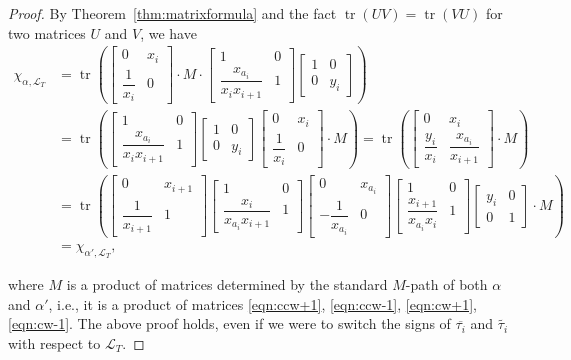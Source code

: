 \documentclass[10pt,a4paper]{amsart}
\numberwithin{equation}{section}
\theoremstyle{definition}
\begin{document}
\begin{proof}
 By Theorem~\ref{thm:matrixformula} and the fact $\operatorname{tr}(UV)=\operatorname{tr}(VU)$ for two matrices $U$ and $V$, we have
 \begin{align*}
 \chi_{\alpha, \mathcal{L}_T}&=\operatorname{tr}\left(
 \begin{bmatrix}
 0 & x_i\\
 \dfrac{1}{x_i} & 0
 \end{bmatrix}\cdot M\cdot
 \begin{bmatrix}
 1 & 0\\
 \dfrac{x_{a_i}}{x_i x_{i+1}} & 1
 \end{bmatrix}
 \begin{bmatrix}
 1 & 0\\
 0 & y_i
 \end{bmatrix}\right)\\
 &=\operatorname{tr}\left(
 \begin{bmatrix}
 1 & 0\\
 \dfrac{x_{a_i}}{x_i x_{i+1}} & 1
 \end{bmatrix}
 \begin{bmatrix}
 1 & 0\\
 0 & y_i
 \end{bmatrix}
 \begin{bmatrix}
 0 & x_i\\
 \dfrac{1}{x_i} & 0
 \end{bmatrix}\cdot M
 \right)
 = \operatorname{tr}\left(
 \begin{bmatrix}
 0 & x_i\\
 \dfrac{y_i}{x_i} & \dfrac{x_{a_i}}{x_{i+1}}
 \end{bmatrix}\cdot M
 \right)\\
 &=\operatorname{tr}\left(
 \begin{bmatrix}
 0 & x_{i+1}\\
 \dfrac{1}{x_{i+1}} & 1
 \end{bmatrix}
 \begin{bmatrix}
 1 & 0\\
 \dfrac{x_i}{x_{a_i} x_{i+1}} & 1
 \end{bmatrix}
 \begin{bmatrix}
 0 & x_{a_i}\\
 -\dfrac{1}{x_{a_i}} & 0
 \end{bmatrix}
 \begin{bmatrix}
 1 & 0\\
 \dfrac{x_{i+1}}{x_{a_i}x_{i}} & 1
 \end{bmatrix}
 \begin{bmatrix}
 y_i & 0\\
 0 & 1
 \end{bmatrix}\cdot M
 \right)\\
 & = \chi_{\alpha', \mathcal{L}_T},
\end{align*}

\noindent where $M$ is a product of matrices determined by the standard $M$-path of both $\alpha$ and $\alpha'$, i.e., it is a product of matrices \eqref{eqn:ccw+1}, \eqref{eqn:ccw-1}, \eqref{eqn:cw+1}, \eqref{eqn:cw-1}. The above proof holds, even if we were to switch the signs of $\overline{\tau_i}$ and $\widetilde{\tau_i}$ with respect to $\mathcal{L}_T$.
\end{proof}
\end{document}
